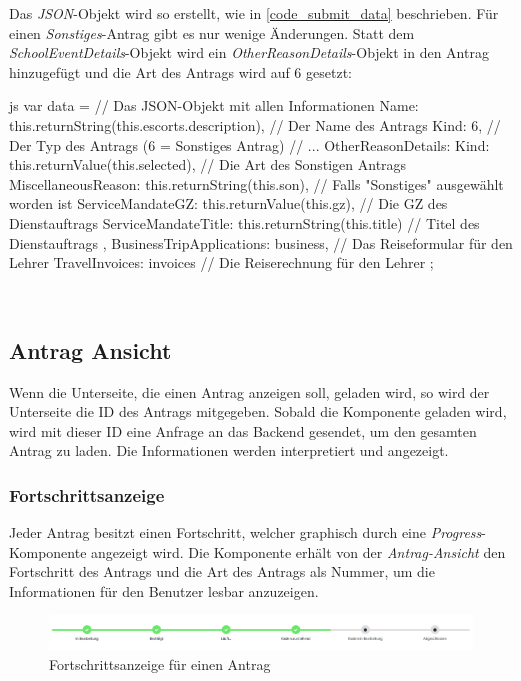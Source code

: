 Das \textit{JSON}-Objekt wird so erstellt, wie in \autoref{code_submit_data} beschrieben. Für einen \textit{Sonstiges}-Antrag gibt es nur wenige Änderungen.
Statt dem \textit{SchoolEventDetails}-Objekt wird ein \textit{OtherReasonDetails}-Objekt in den Antrag hinzugefügt und die Art des Antrags wird auf 6 gesetzt:
\begin{code}{js}
var data = {		// Das JSON-Objekt mit allen Informationen
	Name: this.returnString(this.escorts.description),	// Der Name des Antrags
	Kind: 6,	// Der Typ des Antrags (6 = Sonstiges Antrag)
	// ...
	OtherReasonDetails: {
		Kind: this.returnValue(this.selected),	// Die Art des Sonstigen Antrags
		MiscellaneousReason: this.returnString(this.son),	// Falls "Sonstiges" ausgewählt worden ist
		ServiceMandateGZ: this.returnValue(this.gz),	// Die GZ des Dienstauftrags
		ServiceMandateTitle: this.returnString(this.title)	// Titel des Dienstauftrags
	},
	BusinessTripApplications: business,	// Das Reiseformular für den Lehrer
	TravelInvoices: invoices	// Die Reiserechnung für den Lehrer
};
\end{code}
~\\
\newpage
\subsection{Antrag Ansicht}
\label{sec:antrag_ansicht}
Wenn die Unterseite, die einen Antrag anzeigen soll, geladen wird, so wird der Unterseite die ID des Antrags mitgegeben. Sobald die Komponente geladen wird, wird mit dieser ID eine Anfrage an das Backend gesendet, um den gesamten Antrag zu laden. Die Informationen werden interpretiert und angezeigt.
\subsubsection{Fortschrittsanzeige}
Jeder Antrag besitzt einen Fortschritt, welcher graphisch durch eine \textit{Progress}-Komponente angezeigt wird. Die Komponente erhält von der \textit{Antrag-Ansicht} den Fortschritt des Antrags und die Art des Antrags als Nummer, um die Informationen für den Benutzer lesbar anzuzeigen.
\begin{figure}
	\centering
	\includegraphics[width=1\linewidth]{images/progress}
	\caption[Fortschrittsanzeige]{Fortschrittsanzeige für einen Antrag}
	\label{fig:progress}
\end{figure}
